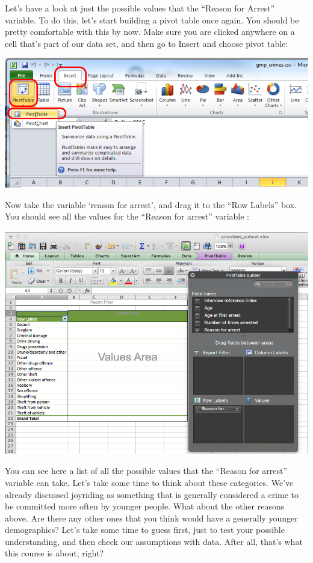 \documentclass[
]{book}
\begin{document}
Let's have a look at just the possible values that the ``Reason for Arrest'' variable. To do this, let's start building a pivot table once again. You should be pretty comfortable with this by now. Make sure you are clicked anywhere on a cell that's part of our data set, and then go to Insert
and choose pivot table:

\includegraphics{imgs/click_pivot.png}

Now take the variable `reason for arrest', and drag it to the ``Row Labels'' box. You should see all the values for the ``Reason for arrest'' variable :

\includegraphics{imgs/reason_arr_values.png}

You can see here a list of all the possible values that the ``Reason for arrest'' variable can take. Let's take some time to think about these categories. We've already discussed joyriding as something that is generally considered a crime to be committed more often by younger people. What about the other reasons above. Are there any other ones that you think would have a generally younger demographics? Let's take some time to guess first, just to test your possible understanding, and then check our assumptions with data. After all, that's what this course is about, right?
\end{document}

